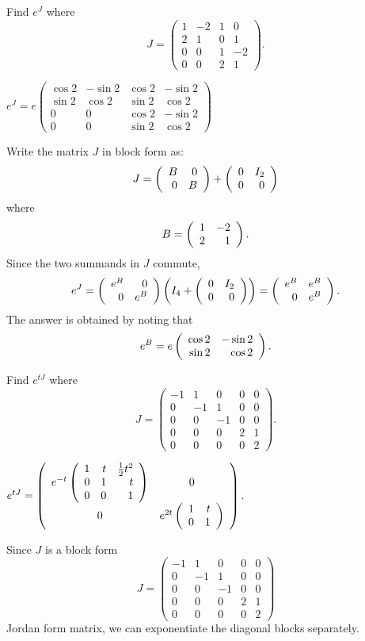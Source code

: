 \documentclass{ximera}
\begin{document}
\begin{exercise} \label{c11.1.3C}
Find $e^J$ where 
\[
J = \left(\begin{array}{rrrr} 
1 & -2 & 1 &  0 \\ 
2 &  1 & 0 &  1 \\
0 &  0 & 1 & -2 \\
0 &  0 & 2 &  1
\end{array}\right).
\]

\begin{solution}
\ans $e^J = e\left(\begin{array}{rrrr}
  \cos 2 & -\sin 2 & \cos 2 & -\sin 2\\
  \sin 2 &  \cos 2 & \sin 2 &  \cos 2\\
     0   &    0    &  \cos 2 &  -\sin 2\\
     0   &    0    &  \sin 2 &   \cos 2  
\end{array}\right)$

\soln Write the matrix $J$ in block form as:
\[
J = \left(\begin{array}{rr} B & 0\\ 0 &B\end{array}\right) + \left(\begin{array}{rr} 0 & I_2\\ 0 &0\end{array}\right)
\]
where 
\[
B = \left(\begin{array}{rr} 1 & -2\\ 2 &1\end{array}\right).
\]
Since the two summands in $J$ commute, 
\[
e^J = \left(\begin{array}{rr} e^B & 0\\ 0 &e^B\end{array}\right)\left(I_4 + \left(\begin{array}{rr} 0 & I_2\\ 0 &0\end{array}\right)\right)
= \left(\begin{array}{rr} e^B & e^B\\ 0 &e^B\end{array}\right).
\]
The answer is obtained by noting that 
\[
e^B = e\left(\begin{array}{rr} \cos 2 & -\sin 2\\ \sin 2 &\cos 2\end{array}\right).
\]


\end{solution}
\end{exercise}

\begin{exercise} \label{c11.1.7}
Find $e^{tJ}$ where 
\[
J = \left(\begin{array}{rrrrr} 
-1 &  1 &  0 &  0 & 0 \\ 
 0 & -1 &  1 &  0 & 0 \\
 0 &  0 & -1 &  0 & 0 \\
 0 &  0 &  0 &  2 & 1 \\
 0 &  0 &  0 &  0 & 2
\end{array}\right).
\]

\begin{solution}

\ans $e^{tJ}= \left(\begin{array}{cc} e^{-t}\left(\begin{array}{rrr} 
 1 & t & \frac{1}{2}t^2\\ 0 & 1 & t\\ 0 & 0 & 1\end{array}\right) & 0\\ 0 &e^{2t}\left(\begin{array}{rr} 1 & t\\ 0 &1\end{array}\right)\end{array}\right)$.

\soln Since $J$ is a block form
\[
J = \left(\begin{array}{rrr|rr} 
-1 &  1 &  0 &  0 & 0 \\ 
 0 & -1 &  1 &  0 & 0 \\
 0 &  0 & -1 &  0 & 0 \\
\hline
 0 &  0 &  0 &  2 & 1 \\
 0 &  0 &  0 &  0 & 2
\end{array}\right)
\]
Jordan form matrix, we can exponentiate the diagonal blocks separately.

\end{solution}
\end{exercise}
\end{document}

